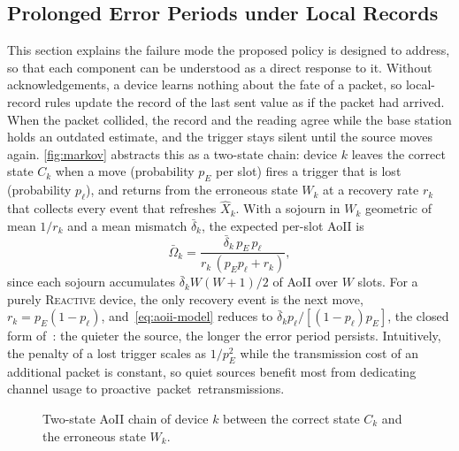 \documentclass[conference]{IEEEtran}
\begin{document}
\subsection{Prolonged Error Periods under Local Records}
\label{sec:desync}
  This section explains the failure mode the proposed policy is designed to address, so that each component can be understood as a direct response to it.
  Without acknowledgements, a device learns nothing about the fate of a packet, so local-record rules update the record of the last sent value as if the packet had arrived.
  When the packet collided, the record and the reading agree while the base station holds an outdated estimate, and the trigger stays silent until the source moves again.
  \autoref{fig:markov} abstracts this as a two-state chain: device $k$ leaves the correct state $C_k$ when a move (probability $p_E$ per slot) fires a trigger that is lost (probability $p_\ell$), and returns from the erroneous state $W_k$ at a recovery rate $r_k$ that collects every event that refreshes $\hat{X}_k$.
  With a sojourn in $W_k$ geometric of mean $1/r_k$ and a mean mismatch $\bar\delta_k$, the expected per-slot AoII is
  \begin{equation}
    \bar\Omega_k = \frac{\bar\delta_k\, p_E\, p_\ell}{r_k\,(p_E p_\ell + r_k)},
    \label{eq:aoii-model}
  \end{equation}
  since each sojourn accumulates $\bar\delta_k W(W+1)/2$ of AoII over $W$ slots.
  For a purely \textsc{Reactive} device, the only recovery event is the next move, $r_k = p_E(1-p_\ell)$, and~\eqref{eq:aoii-model} reduces to $\bar\delta_k p_\ell / [(1-p_\ell) p_E]$, the closed form of~\cite{munari2024monitoring}: the quieter the source, the longer the error period persists.
  Intuitively, the penalty of a lost trigger scales as $1/p_E^2$ while the transmission cost of an additional packet is constant, so quiet sources benefit most from dedicating channel usage to proactive~packet~retransmissions.

  \begin{figure}[t]
    \centering
    \caption{Two-state AoII chain of device $k$ between the correct state $C_k$ and the erroneous state $W_k$.}
    \label{fig:markov}
  \end{figure}
\end{document}
